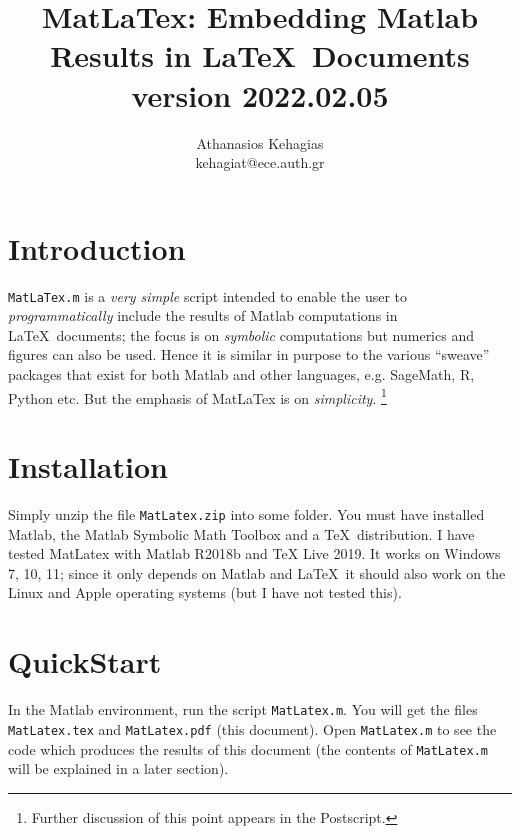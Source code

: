 \documentclass{article}
\title{\textsf{MatLaTex}: Embedding \textsf{Matlab} Results in \LaTeX\ Documents\\ {\small version 2022.02.05}}
\author{Athanasios Kehagias\\kehagiat@ece.auth.gr}
\begin{document}
 
  \maketitle 
  \section{Introduction} 
  \texttt{MatLaTex.m} is a \emph{very simple} script intended to enable the user to \emph{programmatically}  
  include the results of \textsf{Matlab} computations in \LaTeX\  documents; 
  the focus is on \emph{symbolic} computations but numerics and figures can also be used.  
  Hence it is similar in purpose to the various ``sweave'' packages that exist for both \textsf{Matlab}  and other 
  languages, e.g. \textsf{SageMath}, \textsf{R}, \textsf{Python} etc. But the emphasis of \textsf{MatLaTex} is on \emph{simplicity}. 
  \footnote{Further discussion of this point appears in the Postscript.} 
  
  \section{Installation} 
  Simply unzip the file \texttt{MatLatex.zip} into some folder. You must have installed \textsf{Matlab},  
  the  \textsf{Matlab Symbolic Math Toolbox} and a \TeX\  distribution.  
  I have tested \textsf{MatLatex} with \textsf{Matlab R2018b} and \textsf{TeX Live 2019}. 
  It works on \textsf{Windows 7, 10, 11}; since it only depends on \textsf{Matlab} and \LaTeX\, 
  it should also work on the \textsf{Linux} and \textsf{Apple} operating systems 
  (but I have not tested this). 
   
  \section{QuickStart} 
  In the \textsf{Matlab} environment, run the script \texttt{MatLatex.m}.  
  You will get the files \texttt{MatLatex.tex} and \texttt{MatLatex.pdf} (this document). 
  Open \texttt{MatLatex.m} to see the code which produces the results of this document 
  (the contents of \texttt{MatLatex.m} will be explained in a later section). 
   
\end{document}
